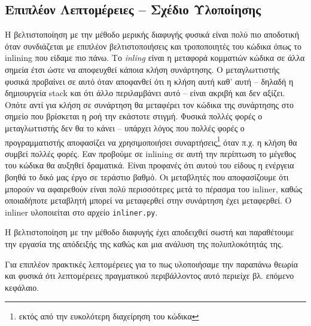 
\subsection{Επιπλέον Λεπτομέρειες – Σχέδιο Υλοποίησης}

Η βελτιστοποίηση με την μέθοδο μερικής διαφυγής φυσικά είναι πολύ πιο αποδοτική
όταν συνδιάζεται με επιπλέον βελτιστοποιήσεις και τροποποιητές του κώδικα όπως
το inlining που είδαμε πιο πάνω. Το \textit{inling} είναι η μεταφορά κομματιών
κώδικα σε άλλα σημεία έτσι ώστε να αποφευχθεί κάποια κλήση συνάρτησης. Ο
μεταγλωττιστής φυσικά προβαίνει σε αυτό όταν αποφανθεί ότι η κλήση αυτή καθ'
αυτή – δηλαδή η δημιουργεία stack και ότι άλλο περιλαμβάνει αυτό – είναι ακριβή
και δεν αξίζει. Οπότε αντί για κλήση σε συνάρτηση θα μεταφέρει τον κώδικα της
συνάρτησης στο σημείο που βρίσκεται η ροή την εκάστοτε στιγμή. Φυσικά πολλές
φορές ο μεταγλωττιστής δεν θα το κάνει – υπάρχει λόγος που πολλές φορές ο
προγραμματιστής αποφασίζει να χρησιμοποιήσει συναρτήσεις\footnote{εκτός από την
ευκολότερη διαχείρηση του κώδικα} όταν π.χ. η κλήση θα συμβεί πολλές φορές. Εαν
προβούμε σε inlining σε αυτή την περίπτωση το μέγεθος του κώδικα θα αυξηθεί
δραματικά. Είναι προφανές ότι αυτού του είδους η ενέργεια βοηθά το δικό μας έργο
σε τεράστιο βαθμό. Οι μεταβλητές που αποφασίζουμε ότι μπορούν να αφαιρεθούν
είναι πολύ περισσότερες μετά το πέρασμα του inliner, καθώς οποιαδήποτε μεταβλητή
μπορεί να μεταφερθεί στην συνάρτηση έχει μεταφερθεί. Ο inliner υλοποιείται στο
αρχείο \texttt{inliner.py}.

Η βελτιστοποίηση με την μέθοδο διαφυγής έχει αποδειχθεί σωστή και παραθέτουμε
την εργασία της απόδειξής της\cite{proof} καθώς και μια ανάλυση της
πολυπλοκότητάς της\cite{complexity}.

Για επιπλέον πρακτικές λεπτομέρειες για το πως υλοποιήσαμε την παραπάνω θεωρία
και  φυσικά ότι λεπτομέρειες πραγματικού περιβάλλοντος αυτό περιείχε βλ.
επόμενο κεφάλαιο.